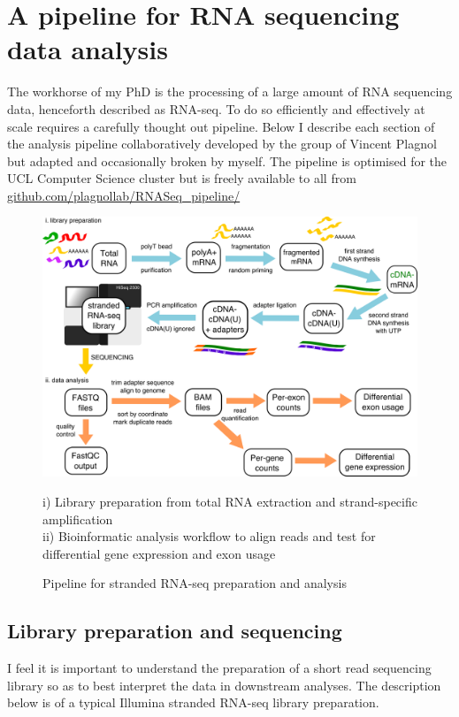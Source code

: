 
\chapter{A pipeline for RNA sequencing data analysis}
\label{chapter:methods}


The workhorse of my PhD is the processing of a large amount of RNA sequencing data, henceforth described as RNA-seq. To do so efficiently and effectively at scale requires a carefully thought out pipeline. Below I describe each section of the analysis pipeline collaboratively developed by the group of Vincent Plagnol but adapted and occasionally broken by myself. The pipeline is optimised for the UCL Computer Science cluster but is freely available to all from \url{github.com/plagnollab/RNASeq_pipeline/}

\begin{figure}[h!]
	\begin{center}
		\includegraphics[width=14cm]{Figures/02_methods/RNAseq_pipeline_schematic.png}
	\end{center}
	\caption{Pipeline for stranded RNA-seq preparation and analysis}
	i) Library preparation from total RNA extraction and strand-specific amplification\\
	ii) Bioinformatic analysis workflow to align reads and test for differential gene expression and exon usage
\end{figure}

\section{Library preparation and sequencing}
I feel it is important to understand the preparation of a short read sequencing library so as to best interpret the data in downstream analyses. The description below is of a typical Illumina stranded RNA-seq library preparation.

